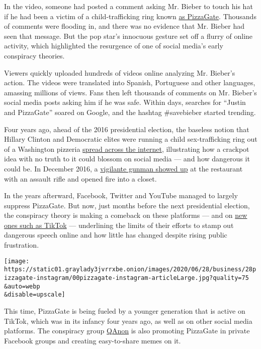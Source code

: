 In the video, someone had posted a comment asking Mr. Bieber to touch
his hat if he had been a victim of a child-trafficking ring known
\href{https://www.nytimes3xbfgragh.onion/search?query=Pizzagate}{as
PizzaGate}. Thousands of comments were flooding in, and there was no
evidence that Mr. Bieber had seen that message. But the pop star's
innocuous gesture set off a flurry of online activity, which highlighted
the resurgence of one of social media's early conspiracy theories.

Viewers quickly uploaded hundreds of videos online analyzing Mr.
Bieber's action. The videos were translated into Spanish, Portuguese and
other languages, amassing millions of views. Fans then left thousands of
comments on Mr. Bieber's social media posts asking him if he was safe.
Within days, searches for ``Justin and PizzaGate'' soared on Google, and
the hashtag \#savebieber started trending.

Four years ago, ahead of the 2016 presidential election, the baseless
notion that Hillary Clinton and Democratic elites were running a child
sex-trafficking ring out of a Washington pizzeria
\href{https://www.nytimes3xbfgragh.onion/2016/11/21/technology/fact-check-this-pizzeria-is-not-a-child-trafficking-site.html?searchResultPosition=11}{spread
across the internet}, illustrating how a crackpot idea with no truth to
it could blossom on social media --- and how dangerous it could be. In
December 2016, a
\href{https://www.nytimes3xbfgragh.onion/2016/12/05/business/media/comet-ping-pong-pizza-shooting-fake-news-consequences.html?searchResultPosition=12}{vigilante
gunman showed up} at the restaurant with an assault rifle and opened
fire into a closet.

In the years afterward, Facebook, Twitter and YouTube managed to largely
suppress PizzaGate. But now, just months before the next presidential
election, the conspiracy theory is making a comeback on these platforms
--- and on
\href{https://www.nytimes3xbfgragh.onion/2020/06/03/technology/tiktok-is-the-future.html}{new
ones such as TikTok} --- underlining the limits of their efforts to
stamp out dangerous speech online and how little has changed despite
rising public frustration.

\texttt{[image: https://static01.graylady3jvrrxbe.onion/images/2020/06/28/business/28pizzagate-instagram/00pizzagate-instagram-articleLarge.jpg?quality=75\\\&auto=webp\\\&disable=upscale]}

This time, PizzaGate is being fueled by a younger generation that is
active on TikTok, which was in its infancy four years ago, as well as on
other social media platforms. The conspiracy group
\href{https://www.nytimes3xbfgragh.onion/2020/07/14/us/politics/qanon-politicians-candidates.html}{QAnon}
is also promoting PizzaGate in private Facebook groups and creating
easy-to-share memes on it.

